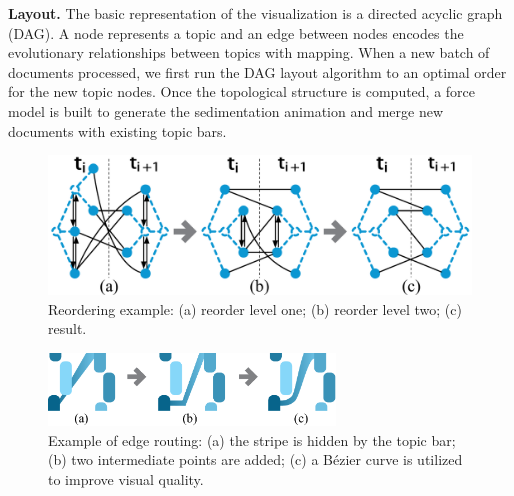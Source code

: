 \noindent\textbf{\normalsize Layout.}
The basic representation of the visualization is a directed acyclic graph (DAG).
A node represents a topic and an edge between nodes encodes the evolutionary relationships between topics with mapping.
When a new batch of documents  processed, we first run the DAG layout algorithm to  an optimal order for the new topic nodes.
Once the topological structure is computed,  a force model is built to generate the sedimentation animation and merge new documents with existing topic bars.

\begin{figure}[t]
  \centering
 \includegraphics[width=\columnwidth]{fig/reorder}
 \vspace{-3mm}
  \caption{
Reordering example: (a) reorder level one; (b) reorder level two; (c) result.
}
  \label{fig:reorder}
  \vspace{-1mm}
\end{figure}

\begin{figure}[t]
  \centering
 \includegraphics[width=3in]{fig/route}
  \caption{
  Example of edge routing: (a) the stripe is hidden by the topic bar; (b) two intermediate points are added; (c) a B\'{e}zier curve is utilized to improve visual quality.
  }
  \label{fig:route}
  \vspace{-5mm}
\end{figure}



